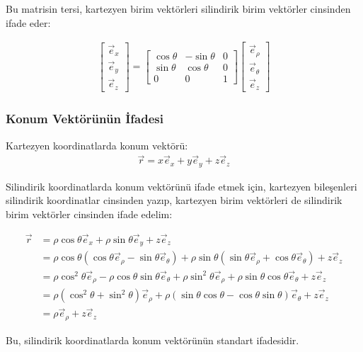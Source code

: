 \documentclass{fenbil}
\begin{document}
Bu matrisin tersi, kartezyen birim vektörleri silindirik birim vektörler cinsinden ifade eder:

\begin{align}
\begin{bmatrix} \vec{e}_x \\ \vec{e}_y \\ \vec{e}_z \end{bmatrix} = 
\begin{bmatrix} 
\cos\theta & -\sin\theta & 0 \\
\sin\theta & \cos\theta & 0 \\
0 & 0 & 1
\end{bmatrix}
\begin{bmatrix} \vec{e}_\rho \\ \vec{e}_\theta \\ \vec{e}_z \end{bmatrix}
\end{align}

\subsubsection{Konum Vektörünün İfadesi}

Kartezyen koordinatlarda konum vektörü:
\begin{align}
\vec{r} = x\vec{e}_x + y\vec{e}_y + z\vec{e}_z
\end{align}

Silindirik koordinatlarda konum vektörünü ifade etmek için, kartezyen bileşenleri silindirik koordinatlar cinsinden yazıp, kartezyen birim vektörleri de silindirik birim vektörler cinsinden ifade edelim:

\begin{align}
\vec{r} &= \rho\cos\theta\vec{e}_x + \rho\sin\theta\vec{e}_y + z\vec{e}_z \\
&= \rho\cos\theta(\cos\theta\vec{e}_\rho - \sin\theta\vec{e}_\theta) + \rho\sin\theta(\sin\theta\vec{e}_\rho + \cos\theta\vec{e}_\theta) + z\vec{e}_z \\
&= \rho\cos^2\theta\vec{e}_\rho - \rho\cos\theta\sin\theta\vec{e}_\theta + \rho\sin^2\theta\vec{e}_\rho + \rho\sin\theta\cos\theta\vec{e}_\theta + z\vec{e}_z \\
&= \rho(\cos^2\theta + \sin^2\theta)\vec{e}_\rho + \rho(\sin\theta\cos\theta - \cos\theta\sin\theta)\vec{e}_\theta + z\vec{e}_z \\
&= \rho\vec{e}_\rho + z\vec{e}_z
\end{align}

Bu, silindirik koordinatlarda konum vektörünün standart ifadesidir.
\end{document}
